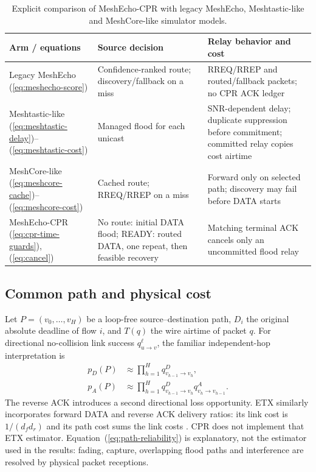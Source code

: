 \documentclass[conference,letterpaper,10pt]{IEEEtran}
\begin{document}
\begin{table}[t]
\centering
\caption{Explicit comparison of MeshEcho-CPR with legacy MeshEcho,
Meshtastic-like and MeshCore-like simulator models.}
\label{tab:protocol-map}
\footnotesize
\setlength{\tabcolsep}{2.5pt}
\begin{tabular}{@{}>{\raggedright\arraybackslash}p{}>{\raggedright\arraybackslash}p{}>{\raggedright\arraybackslash}p{}@{}}
\toprule
Arm / equations & Source decision & Relay behavior and cost\\
\midrule
Legacy MeshEcho (\ref{eq:meshecho-score}) & Confidence-ranked route; discovery/fallback on a miss &
RREQ/RREP and routed/fallback packets; no CPR ACK ledger\\
Meshtastic-like (\ref{eq:meshtastic-delay})--(\ref{eq:meshtastic-cost}) & Managed flood for each unicast &
SNR-dependent delay; duplicate suppression before commitment; committed relay copies cost airtime\\
MeshCore-like (\ref{eq:meshcore-cache})--(\ref{eq:meshcore-cost}) & Cached route; RREQ/RREP on a miss &
Forward only on selected path; discovery may fail before DATA starts\\
MeshEcho-CPR (\ref{eq:cpr-time-guards}), (\ref{eq:cancel}) & No route: initial DATA flood; READY: routed DATA, one repeat, then feasible recovery &
Matching terminal ACK cancels only an uncommitted flood relay\\
\bottomrule
\end{tabular}
\end{table}

\subsection{Common path and physical cost}
Let $P=(v_0,\ldots,v_H)$ be a loop-free source--destination path,
$D_i$ the original absolute deadline of flow $i$, and $T(q)$ the wire airtime
of packet $q$. For directional no-collision link success $q_{u\to v}^{\ell}$,
the familiar independent-hop interpretation is
\begin{equation}
\begin{aligned}
p_D(P)&\approx\prod_{h=1}^{H}q_{v_{h-1}\to v_h}^{D},\\
p_A(P)&\approx\prod_{h=1}^{H}
 q_{v_{h-1}\to v_h}^{D}q_{v_h\to v_{h-1}}^{A}.
\end{aligned}
\label{eq:path-reliability}
\end{equation}
The reverse ACK introduces a second directional loss opportunity.
ETX similarly incorporates forward DATA and reverse ACK delivery ratios:
its link cost is $1/(d_f d_r)$ and its path cost sums the link costs
\cite{decouto2003etx}. CPR does not implement that ETX estimator.
Equation~(\ref{eq:path-reliability}) is explanatory, not the estimator used
in the results: fading, capture, overlapping flood paths and interference
are resolved by physical packet receptions.
\end{document}
